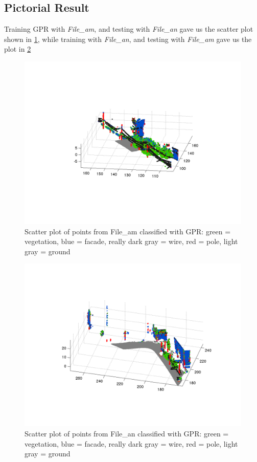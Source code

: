 \documentclass[letterpaper]{article}
\begin{document}
\subsection*{Pictorial Result}
Training GPR with \textit{File\_am}, and testing with
\textit{File\_an} gave us the scatter plot shown in \ref{Fig_GPR1},
while training with \textit{File\_an}, and testing with
\textit{File\_am} gave us the plot in \ref{Fig_GPR2}
\begin{figure}
\includegraphics[width=.8\linewidth]{gpr_trainam_testan.png}
\caption{Scatter plot of points from File\_am classified with GPR: green = vegetation, blue = facade, really dark gray = wire, red = pole, light gray = ground}
\label{Fig_GPR1}
\end{figure}
\begin{figure}
\includegraphics[width=.8\linewidth]{gpr_trainan_testam.png}
\caption{Scatter plot of points from File\_an classified with GPR: green = vegetation, blue = facade, really dark gray = wire, red = pole, light gray = ground}
\label{Fig_GPR2}
\end{figure}
\end{document}
